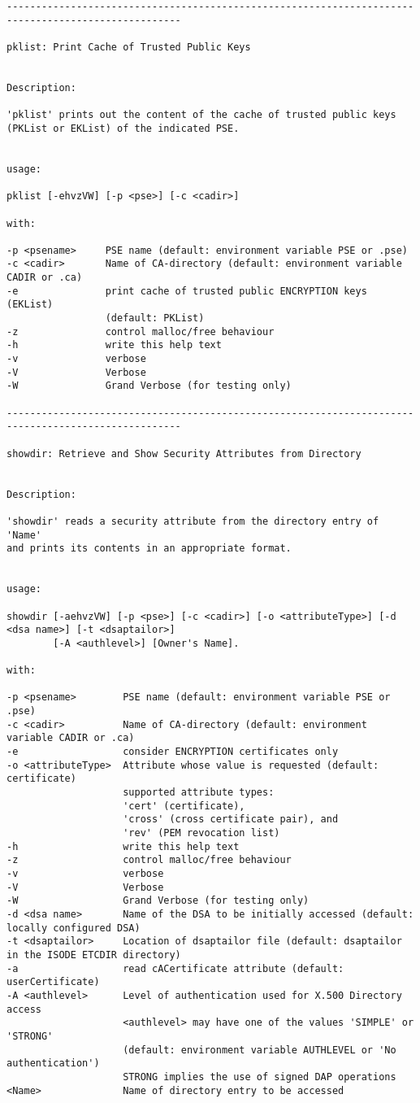 {\begin{verbatim}
----------------------------------------------------------------------------------------------------

pklist: Print Cache of Trusted Public Keys


Description:

'pklist' prints out the content of the cache of trusted public keys
(PKList or EKList) of the indicated PSE.


usage:

pklist [-ehvzVW] [-p <pse>] [-c <cadir>]

with:

-p <psename>     PSE name (default: environment variable PSE or .pse)
-c <cadir>       Name of CA-directory (default: environment variable CADIR or .ca)
-e               print cache of trusted public ENCRYPTION keys (EKList)
                 (default: PKList)
-z               control malloc/free behaviour
-h               write this help text
-v               verbose
-V               Verbose
-W               Grand Verbose (for testing only)

----------------------------------------------------------------------------------------------------

showdir: Retrieve and Show Security Attributes from Directory


Description:

'showdir' reads a security attribute from the directory entry of 'Name'
and prints its contents in an appropriate format.


usage:

showdir [-aehvzVW] [-p <pse>] [-c <cadir>] [-o <attributeType>] [-d <dsa name>] [-t <dsaptailor>]
        [-A <authlevel>] [Owner's Name].

with:

-p <psename>        PSE name (default: environment variable PSE or .pse)
-c <cadir>          Name of CA-directory (default: environment variable CADIR or .ca)
-e                  consider ENCRYPTION certificates only
-o <attributeType>  Attribute whose value is requested (default: certificate)
                    supported attribute types:
                    'cert' (certificate),
                    'cross' (cross certificate pair), and
                    'rev' (PEM revocation list)
-h                  write this help text
-z                  control malloc/free behaviour
-v                  verbose
-V                  Verbose
-W                  Grand Verbose (for testing only)
-d <dsa name>       Name of the DSA to be initially accessed (default: locally configured DSA)
-t <dsaptailor>     Location of dsaptailor file (default: dsaptailor in the ISODE ETCDIR directory)
-a                  read cACertificate attribute (default: userCertificate)
-A <authlevel>      Level of authentication used for X.500 Directory access
                    <authlevel> may have one of the values 'SIMPLE' or 'STRONG'
                    (default: environment variable AUTHLEVEL or 'No authentication')
                    STRONG implies the use of signed DAP operations
<Name>              Name of directory entry to be accessed


\end{verbatim}}
